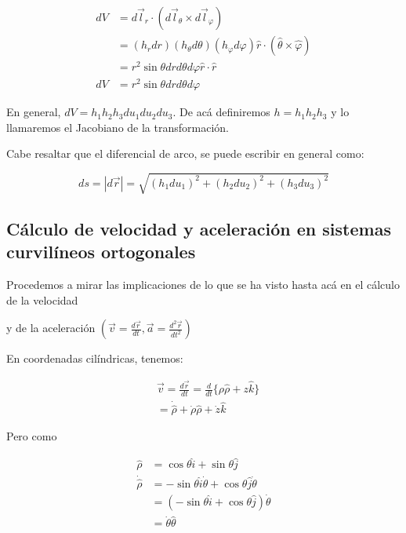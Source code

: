 $$
\begin{aligned}
d V & =d \vec{l}_{r} \cdot\left(d \vec{l}_{\theta} \times d \vec{l}_{\varphi}\right) \\
& =\left(h_{r} d r\right)\left(h_{\theta} d \theta\right)\left(h_{\varphi} d \varphi\right) \widehat{r} \cdot(\widehat{\theta} \times \widehat{\varphi}) \\
& =r^{2} \sin \theta d r d \theta d \varphi \widehat{r} \cdot \widehat{r} \\
d V & =r^{2} \sin \theta d r d \theta d \varphi
\end{aligned}
$$

En general, $d V=h_{1} h_{2} h_{3} d u_{1} d u_{2} d u_{3}$. De acá definiremos $h=h_{1} h_{2} h_{3}$ y lo llamaremos el Jacobiano de la transformación.

Cabe resaltar que el diferencial de arco, se puede escribir en general como:

$$
d s=|d \vec{r}|=\sqrt{\left(h_{1} d u_{1}\right)^{2}+\left(h_{2} d u_{2}\right)^{2}+\left(h_{3} d u_{3}\right)^{2}}
$$

\subsection{Cálculo de velocidad y aceleración en sistemas curvilíneos ortogonales}
Procedemos a mirar las implicaciones de lo que se ha visto hasta acá en el cálculo de la velocidad

y de la aceleración $\left(\vec{v}=\frac{d \vec{r}}{d t}, \vec{a}=\frac{d^{2} \vec{r}}{d t^{2}}\right)$

En coordenadas cilíndricas, tenemos:

$$
\begin{aligned}
& \vec{v}=\frac{d \vec{r}}{d t}=\frac{d}{d t}\{\rho \widehat{\rho}+z \widehat{k}\} \\
& =\dot{\hat{\rho}}+\dot{\rho} \widehat{\rho}+\dot{z} \hat{k}
\end{aligned}
$$

Pero como

$$
\begin{aligned}
\widehat{\rho} & =\cos \theta \hat{i}+\sin \theta \hat{j} \\
\dot{\hat{\rho}} & =-\sin \theta \hat{i} \dot{\theta}+\cos \theta \hat{j} \dot{\theta} \\
& =(-\sin \theta \hat{i}+\cos \theta \hat{j}) \dot{\theta} \\
& =\dot{\theta} \widehat{\theta}
\end{aligned}
$$

